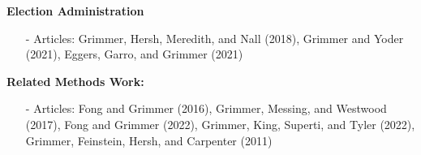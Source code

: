\documentclass[xcolor=dvipsnames]{beamer}
\begin{document}
\begin{frame}
\begin{tiny}
\textbf{Election Administration}
\begin{itemize}
\item[-] Articles: Grimmer, Hersh, Meredith, and Nall (2018), Grimmer and Yoder (2021), Eggers, Garro, and Grimmer (2021) 	
\end{itemize}


\textbf{Related Methods Work:}
\begin{itemize}
	\item[-] Articles: Fong and Grimmer (2016), Grimmer, Messing, and Westwood (2017), Fong and Grimmer (2022), Grimmer, King, Superti, and Tyler (2022), Grimmer, Feinstein, Hersh, and Carpenter (2011)  
\end{itemize} 	

\end{tiny}

\end{frame}
\end{document}
